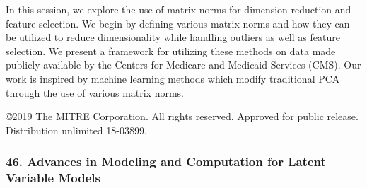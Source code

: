 \begin{itemize}
In this session, we explore the use of matrix norms for dimension reduction and feature selection.  We begin by defining various matrix norms and how they can be utilized to reduce dimensionality while handling outliers as well as feature selection. We present a framework for utilizing these methods on data made publicly available by the Centers for Medicare and Medicaid Services (CMS). Our work is inspired by machine learning methods which modify traditional PCA through the use of various matrix norms. 

©2019 The MITRE Corporation. All rights reserved. Approved for public release. Distribution unlimited 18-03899. 

\end{itemize}

\subsubsection*{46. Advances in Modeling and Computation for Latent Variable Models}

